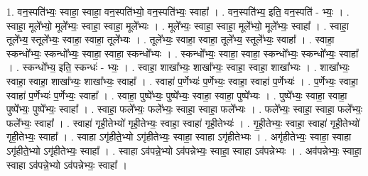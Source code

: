 \documentclass[17pt]{extarticle}
\begin{document}
1. वन॒स्पति॑भ्यः॒ स्वाहा॒ स्वाहा॒ वन॒स्पति॑भ्यो॒ वन॒स्पति॑भ्यः॒ स्वाहा᳚ । . वन॒स्पति॑भ्य॒ इति॒ वन॒स्पति॑ - भ्यः॒ । . स्वाहा॒ मूले᳚भ्यो॒ मूले᳚भ्यः॒ स्वाहा॒ स्वाहा॒ मूले᳚भ्यः । . मूले᳚भ्यः॒ स्वाहा॒ स्वाहा॒ मूले᳚भ्यो॒ मूले᳚भ्यः॒ स्वाहा᳚ । . स्वाहा॒ तूले᳚भ्य॒ स्तूले᳚भ्यः॒ स्वाहा॒ स्वाहा॒ तूले᳚भ्यः । . तूले᳚भ्यः॒ स्वाहा॒ स्वाहा॒ तूले᳚भ्य॒ स्तूले᳚भ्यः॒ स्वाहा᳚ । . स्वाहा॒ स्कन्धो᳚भ्यः॒ स्कन्धो᳚भ्यः॒ स्वाहा॒ स्वाहा॒ स्कन्धो᳚भ्यः । . स्कन्धो᳚भ्यः॒ स्वाहा॒ स्वाहा॒ स्कन्धो᳚भ्यः॒ स्कन्धो᳚भ्यः॒ स्वाहा᳚ । . स्कन्धो᳚भ्य॒ इति॒ स्कन्धः॑ - भ्यः॒ । . स्वाहा॒ शाखा᳚भ्यः॒ शाखा᳚भ्यः॒ स्वाहा॒ स्वाहा॒ शाखा᳚भ्यः । . शाखा᳚भ्यः॒ स्वाहा॒ स्वाहा॒ शाखा᳚भ्यः॒ शाखा᳚भ्यः॒ स्वाहा᳚ । . स्वाहा॑ प॒र्णेभ्यः॑ प॒र्णेभ्यः॒ स्वाहा॒ स्वाहा॑ प॒र्णेभ्यः॑ । . प॒र्णेभ्यः॒ स्वाहा॒ स्वाहा॑ प॒र्णेभ्यः॑ प॒र्णेभ्यः॒ स्वाहा᳚ । . स्वाहा॒ पुष्पे᳚भ्यः॒ पुष्पे᳚भ्यः॒ स्वाहा॒ स्वाहा॒ पुष्पे᳚भ्यः । . पुष्पे᳚भ्यः॒ स्वाहा॒ स्वाहा॒ पुष्पे᳚भ्यः॒ पुष्पे᳚भ्यः॒ स्वाहा᳚ । . स्वाहा॒ फले᳚भ्यः॒ फले᳚भ्यः॒ स्वाहा॒ स्वाहा॒ फले᳚भ्यः । . फले᳚भ्यः॒ स्वाहा॒ स्वाहा॒ फले᳚भ्यः॒ फले᳚भ्यः॒ स्वाहा᳚ । . स्वाहा॑ गृही॒तेभ्यो॑ गृही॒तेभ्यः॒ स्वाहा॒ स्वाहा॑ गृही॒तेभ्यः॑ । . गृ॒ही॒तेभ्यः॒ स्वाहा॒ स्वाहा॑ गृही॒तेभ्यो॑ गृही॒तेभ्यः॒ स्वाहा᳚ । . स्वाहा ऽगृ॑हीते॒भ्यो ऽगृ॑हीतेभ्यः॒ स्वाहा॒ स्वाहा ऽगृ॑हीतेभ्यः । . अगृ॑हीतेभ्यः॒ स्वाहा॒ स्वाहा ऽगृ॑हीते॒भ्यो ऽगृ॑हीतेभ्यः॒ स्वाहा᳚ । . स्वाहा ऽव॑पन्ने॒भ्यो ऽव॑पन्नेभ्यः॒ स्वाहा॒ स्वाहा ऽव॑पन्नेभ्यः । . अव॑पन्नेभ्यः॒ स्वाहा॒ स्वाहा ऽव॑पन्ने॒भ्यो ऽव॑पन्नेभ्यः॒ स्वाहा᳚ । \newline
\end{document}
